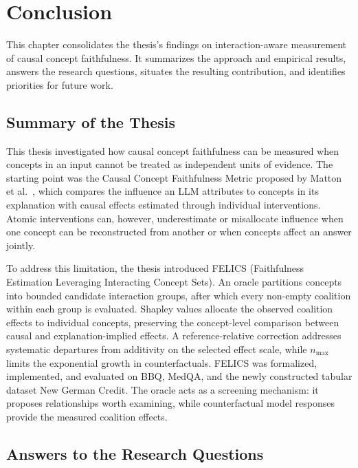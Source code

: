 \chapter{Conclusion}
\label{ch:conclusion}

This chapter consolidates the thesis's findings on interaction-aware measurement of causal concept faithfulness. It summarizes the approach and empirical results, answers the research questions, situates the resulting contribution, and identifies priorities for future work.

\section{Summary of the Thesis}

This thesis investigated how causal concept faithfulness can be measured when concepts in an input cannot be treated as independent units of evidence. The starting point was the Causal Concept Faithfulness Metric proposed by Matton et al.~\cite{mattonWalkTalkMeasuring2024}, which compares the influence an LLM attributes to concepts in its explanation with causal effects estimated through individual interventions. Atomic interventions can, however, underestimate or misallocate influence when one concept can be reconstructed from another or when concepts affect an answer jointly.

To address this limitation, the thesis introduced FELICS (Faithfulness Estimation Leveraging Interacting Concept Sets). An oracle partitions concepts into bounded candidate interaction groups, after which every non-empty coalition within each group is evaluated. Shapley values allocate the observed coalition effects to individual concepts, preserving the concept-level comparison between causal and explanation-implied effects. A reference-relative correction addresses systematic departures from additivity on the selected effect scale, while $n_{\max}$ limits the exponential growth in counterfactuals. FELICS was formalized, implemented, and evaluated on BBQ, MedQA, and the newly constructed tabular dataset New German Credit. The oracle acts as a screening mechanism: it proposes relationships worth examining, while counterfactual model responses provide the measured coalition effects.

\section{Answers to the Research Questions}

